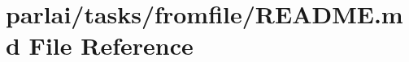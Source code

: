 \hypertarget{parlai_2tasks_2fromfile_2README_8md}{}\section{parlai/tasks/fromfile/\+R\+E\+A\+D\+ME.md File Reference}
\label{parlai_2tasks_2fromfile_2README_8md}
